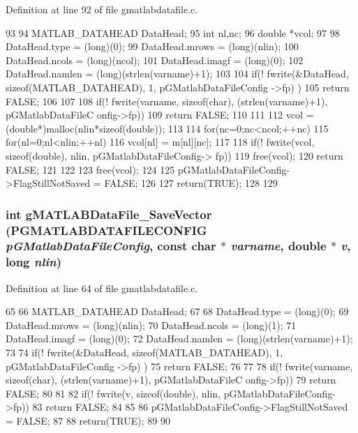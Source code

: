 Definition at line 92 of file gmatlabdatafile.c.


\begin{DoxyCode}
93 {
94         MATLAB_DATAHEAD DataHead;
95         int nl,nc;
96         double *vcol;
97 
98         DataHead.type  = (long)(0);             
99         DataHead.mrows = (long)(nlin);  
100         DataHead.ncols = (long)(ncol);
101         DataHead.imagf = (long)(0);
102         DataHead.namlen = (long)(strlen(varname)+1);
103 
104         if(! fwrite(&DataHead, sizeof(MATLAB_DATAHEAD), 1, pGMatlabDataFileConfig
      ->fp) ){
105                 return FALSE;
106         }
107 
108         if(! fwrite(varname, sizeof(char), (strlen(varname)+1), pGMatlabDataFileC
      onfig->fp)){
109                 return FALSE;
110         }
111 
112         vcol = (double*)malloc(nlin*sizeof(double));
113 
114         for(nc=0;nc<ncol;++nc){
115                 for(nl=0;nl<nlin;++nl){
116                         vcol[nl] = m[nl][nc];
117                 }
118                 if(! fwrite(vcol, sizeof(double), nlin, pGMatlabDataFileConfig->
      fp)){
119                         free(vcol);
120                         return FALSE;
121                 }
122         }
123         free(vcol);
124 
125         pGMatlabDataFileConfig->FlagStillNotSaved = FALSE;
126 
127         return(TRUE);
128 
129 }
\end{DoxyCode}
\subsubsection[{gMATLABDataFile\_\-SaveVector}]{\setlength{\rightskip}{0pt plus 5cm}int gMATLABDataFile\_\-SaveVector ({\bf PGMATLABDATAFILECONFIG} {\em pGMatlabDataFileConfig}, \/  const char $\ast$ {\em varname}, \/  double $\ast$ {\em v}, \/  long {\em nlin})}\label{gmatlabdatafile_8c_a3ecf28836f545707551fe8b8005c8954}


Definition at line 64 of file gmatlabdatafile.c.


\begin{DoxyCode}
65 {
66         MATLAB_DATAHEAD DataHead;
67 
68         DataHead.type  = (long)(0);             
69         DataHead.mrows = (long)(nlin);  
70         DataHead.ncols = (long)(1);
71         DataHead.imagf = (long)(0);
72         DataHead.namlen = (long)(strlen(varname)+1);
73 
74         if(! fwrite(&DataHead, sizeof(MATLAB_DATAHEAD), 1, pGMatlabDataFileConfig
      ->fp) ){
75                 return FALSE;
76         }
77 
78         if(! fwrite(varname, sizeof(char), (strlen(varname)+1), pGMatlabDataFileC
      onfig->fp)){
79                 return FALSE;
80         }
81 
82         if(! fwrite(v, sizeof(double), nlin, pGMatlabDataFileConfig->fp)){
83                 return FALSE;
84         }
85 
86         pGMatlabDataFileConfig->FlagStillNotSaved = FALSE;
87 
88         return(TRUE);
89 
90 }
\end{DoxyCode}
